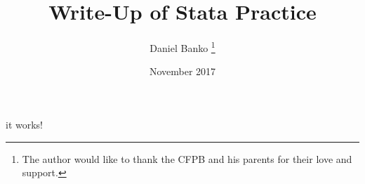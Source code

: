 \documentclass[12pt, letterpaper]{article}
\title{Write-Up of Stata Practice}
\author{Daniel Banko \thanks{The author would like to thank the CFPB and his parents for their love and support.}}
\date{November 2017}
\begin{document}
\begin{titlepage}
\maketitle
\end{titlepage}
\begin{table}

\end{table}
it works!
\end{document}
